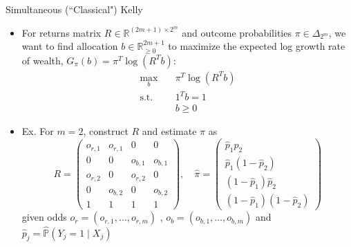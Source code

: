 \documentclass[aspectratio=169,xcolor=dvipsnames]{beamer}
\begin{document}
\begin{frame}{Simultaneous (``Classical") Kelly}
    \begin{itemize}
        \item For returns matrix $R \in \mathbb{R}^{(2m + 1) \times 2^m}$ and outcome probabilities $\pi \in \Delta_{2^m}$, we want to find allocation $b \in \mathbb{R}^{2 m + 1}_{\geq 0}$ to maximize the expected log growth rate of wealth, $G_{\pi} (b) = \pi^T \log(R^Tb)$:
        $$\begin{aligned}
        \max_{b} \quad & \pi^T \log(R^Tb) \\
        \textrm{s.t.} \quad & 1^T b = 1 \\
                            & b \geq 0
        \end{aligned}$$

        \item Ex. For $m = 2$, construct $R$ and estimate $\pi$ as
        $$R = \begin{pmatrix}
        o_{r, 1} & o_{r, 1} & 0 & 0 \\
        0 & 0 & o_{b, 1} & o_{b, 1} \\
        o_{r, 2} & 0 & o_{r, 2} & 0 \\
        0 & o_{b, 2} & 0 & o_{b, 2} \\
        1 & 1 & 1 & 1
        \end{pmatrix}, \quad \hat{\pi} = \begin{pmatrix}
            \hat{p}_1 \hat{p}_2 \\
            \hat{p}_1 (1 - \hat{p}_2) \\
            (1 - \hat{p}_1) \hat{p}_2 \\
            (1 - \hat{p}_1) (1 - \hat{p}_2)
        \end{pmatrix}$$
        given odds $o_{r} = (o_{r,1}, \ldots, o_{r,m})$ , $o_b = (o_{b,1}, \ldots, o_{b,m})$ and $\hat{p}_j = \hat{\mathbb{P}}(Y_j = 1 \mid X_j)$
    \end{itemize}
\end{frame}

\end{document}
